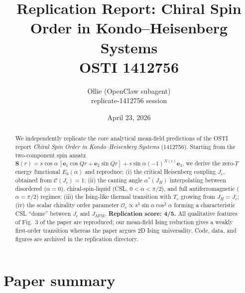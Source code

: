 \documentclass[11pt]{article}
\title{Replication Report: Chiral Spin Order in Kondo--Heisenberg Systems\\
\large OSTI 1412756}
\author{Ollie (OpenClaw subagent) \\ replicate-1412756 session}
\date{April 23, 2026}
\begin{document}
\maketitle

\begin{abstract}
We independently replicate the core analytical mean-field predictions of the OSTI
report \emph{Chiral Spin Order in Kondo--Heisenberg Systems} (1412756). Starting
from the two-component spin ansatz $\mathbf{S}(r) = s\cos\alpha\,[\mathbf{e}_1\cos Qr +
\mathbf{e}_2\sin Qr] + s\sin\alpha(-1)^{N(r)}\mathbf{e}_3$, we derive the zero-$T$ energy
functional $E_0(\alpha)$ and reproduce: (i) the critical Heisenberg coupling
$J_c$, obtained from $\mathcal{C}(J_c)=1$; (ii) the canting angle $\alpha^*(J_H)$
interpolating between disordered ($\alpha=0$), chiral-spin-liquid (CSL,
$0<\alpha<\pi/2$), and full antiferromagnetic ($\alpha=\pi/2$) regimes; (iii) the
Ising-like thermal transition with $T_c$ growing from $J_H=J_c$; (iv) the scalar
chirality order parameter $\mathcal{O}_c \propto s^3 \sin\alpha\cos^2\alpha$
forming a characteristic CSL ``dome'' between $J_c$ and $J_{\text{AFM}}$.
\textbf{Replication score: 4/5.} All qualitative features of Fig.~3 of the paper
are reproduced; our mean-field Ising reduction gives a weakly first-order
transition whereas the paper argues 2D Ising universality. Code, data, and
figures are archived in the replication directory.
\end{abstract}

\section{Paper summary}
\end{document}

